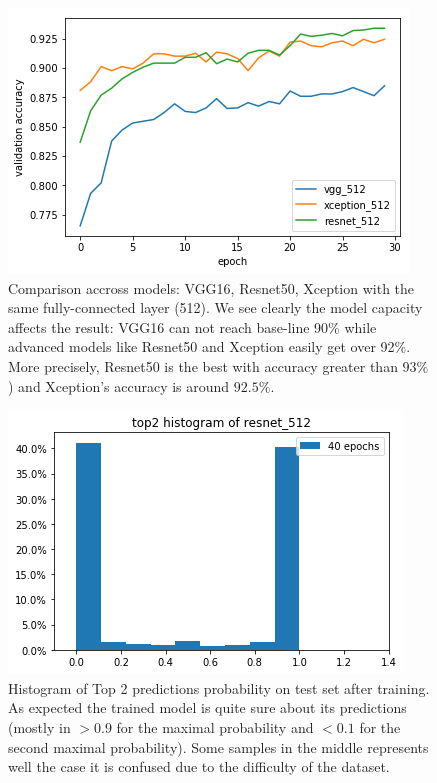 \begin{figure}[tb]
	\centering
	\includegraphics[width=0.7\hsize]{./figures/compareModels}
	\caption{Comparison accross models: VGG16, Resnet50, Xception with the same fully-connected layer (512). We see clearly the model capacity affects the result: VGG16 can not reach base-line 90\% while advanced models like Resnet50 and Xception easily get over 92\%. More precisely, Resnet50 is the best with accuracy greater than $93\%$) and Xception's accuracy is around $92.5\%$.}
	\label{fig:compareModels}
\end{figure}

\begin{figure}[tb]
	\centering
	\includegraphics[width=0.6\hsize]{./figures/top2Histo}
	\caption{Histogram of Top 2 predictions probability on test set after training. As expected the trained model is quite sure about its predictions (mostly in $>0.9$ for the maximal probability and $<0.1$ for the second maximal probability). Some samples in the middle represents well the case it is confused due to the difficulty of the dataset.}
	\label{fig:top2Histo}
\end{figure}


